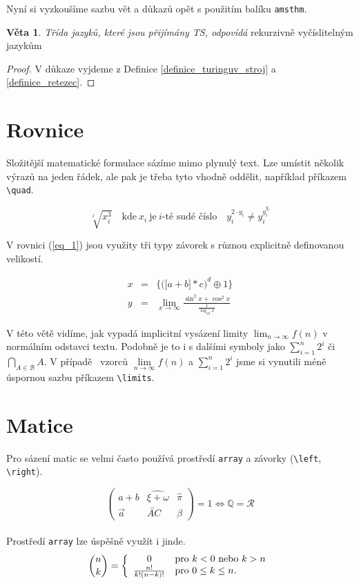 \documentclass[a4paper, 11pt, twocolumn]{article}
\theoremstyle{definition}
\newtheorem{sentence}{Věta}
\begin{document}
    Nyní si vyzkoušíme sazbu vět a důkazů opět s použitím balíku \texttt{amsthm}.
    \begin{sentence}
        \label{veta_trida_jazyku} \textit{Třída jazyků, které jsou přijímány TS, odpovídá} rekurzivně vyčíslitelným jazykům
    \end{sentence}
    
    \begin{proof}
    V důkaze vyjdeme z Definice \ref{definice_turinguv_stroj} a \ref{definice_retezec}. 
    \end{proof}
    
    \section{Rovnice}
    Složitější matematické formulace sázíme mimo plynulý text. Lze umístit několik výrazů na jeden řádek, ale pak je třeba tyto vhodně oddělit, například příkazem \verb!\quad!.
    
    \[
    \sqrt[i]{x_{i}^{3}} \quad \text{kde} \ x_i \  \text{je} \ i\text{-té sudé číslo} \quad y_{i}^{2\cdot y_{i}} \neq y_{i}^{y_{i}^{y_{i}}}
    \]
    
    V rovnici (\ref{eq_1}) jsou využity tři typy závorek s různou explicitně definovanou velikostí.
    
    \begin{eqnarray}
    \label{eq_1}x & = & \bigg\{ \Big(\big[a + b\big] * c\Big)^d \oplus 1 \bigg\} \\
    \label{eq_2}y & = & \lim_{x\to\infty} \frac{\sin^2x + \cos^2x}{\frac{1}{\log_{10}{x}}}
    \end{eqnarray}
    
    V této větě vidíme, jak vypadá implicitní vysázení limity ${\lim_{n\to\infty}f(n)}$ v normálním odstavci textu. Podobně je to i s dalšími symboly jako ${\sum_{i=1}^{n}2^i}$ či ${\bigcap_{A\in\mathcal{B}} A}$. V pří\-padě ~vzorců ${\lim\limits _{n\to\infty}f(n)}$ a ${\sum\limits _{i=1}^{n}2^i}$ jsme si vynutili méně úspornou sazbu příkazem \verb!\limits!.
    
    \section{Matice}
    Pro sázení matic se velmi často používá prostředí \texttt{array} a závorky (\verb!\left!, \verb!\right!).
    
    $$
    	\left(
    	\begin{array}{ccc}
    		a + b & \widehat{\xi + \omega} & \hat{\pi} \\
    		\vec a & \overleftrightarrow{AC} & \beta
    	\end{array}
    	\right) = 1 \Longleftrightarrow \mathbb{Q} = \mathcal{R}
	$$ 
    \\ Prostředí \texttt{array} lze úspěšně využít i jinde.
    $$
		\binom{n}{k} =
		\left\{
		\begin{array}{c l}
			0 & \text{pro } k < 0 \text{ nebo } k > n \\
			\frac{n!}{k! (n - k)!} & \text{pro } 0 \leq k \leq n \text{.}
		\end{array}
		\right.
	$$
\end{document}
